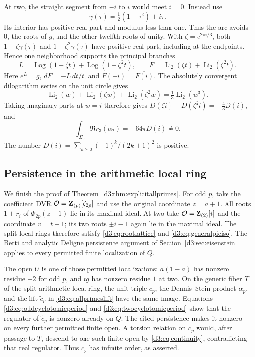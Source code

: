 At two, the straight segment from $-i$ to $i$ would meet $t=0$.
Instead use
\[
 \gamma(\tau)=\tfrac12(1-\tau^2)+i\tau .
\]
Its interior has positive real part and modulus less than one.
Thus the arc avoids $0$, the roots of $g$, and the other twelfth
roots of unity. With $\zeta=e^{2\pi i/3}$, both
$1-\zeta\gamma(\tau)$ and $1-\zeta^2\gamma(\tau)$ have positive
real part, including at the endpoints. Hence one neighborhood
supports the principal branches
\[
 L=\operatorname{Log}(1-\zeta t)+\operatorname{Log}(1-\zeta^2t),
 \qquad
 F=\operatorname{Li}_2(\zeta t)+\operatorname{Li}_2(\zeta^2t).
\]
Here $e^L=g$, $dF=-L\,dt/t$, and
$F(-i)=\overline{F(i)}$.
The absolutely convergent dilogarithm series on the unit circle gives
\[
 \operatorname{Li}_2(w)+\operatorname{Li}_2(\zeta w)
 +\operatorname{Li}_2(\zeta^2w)=\tfrac13\operatorname{Li}_2(w^3).
\]
Taking imaginary parts at $w=i$ therefore gives
$D(\zeta i)+D(\zeta^2i)=-\tfrac43D(i)$, and
\begin{equation}\label{d3:eq:twocyclotomicperiod}
 \int_{\Sigma_\gamma}\Re r_3(\alpha_2)
 =-64\pi D(i)\ne0.
\end{equation}
The number $D(i)=\sum_{k\geq0}(-1)^k/(2k+1)^2$ is positive.

\subsection{Persistence in the arithmetic local ring}

We finish the proof of Theorem~\ref{d3:thm:explicitallprimes}.
For odd $p$, take the coefficient DVR
$\mathcal O=\mathbf Z_{(p)}[\zeta_{2p}]$ and use the original coordinate $z=a+1$.
All roots $1+r_i$ of $\Phi_{2p}(z-1)$ lie in its maximal ideal.
At two take $\mathcal O=\mathbf Z_{(2)}[i]$ and the coordinate $v=t-1$; its
two roots $\pm i-1$ again lie in the maximal ideal.
The split local rings therefore satisfy \eqref{d3:eq:rootlattice}
and \eqref{d3:eq:generalpiciso}. The Betti and analytic Deligne
persistence argument of Section~\ref{d3:sec:eisenstein} applies to
every permitted finite localization of $Q$.

The open $U$ is one of those permitted localizations:
$a(1-a)$ has nonzero residue $-2$ for odd $p$, and $tg$ has
nonzero residue $1$ at two. On the generic fiber $T$ of the split
arithmetic local ring, the unit triple $c_p$, the Dennis--Stein
product $\alpha_p$, and the lift $\widetilde c_p$ in
\eqref{d3:eq:allprimeslift} have the same image.
Equations \eqref{d3:eq:oddcyclotomicperiod} and
\eqref{d3:eq:twocyclotomicperiod} show that the regulator of
$\widetilde c_p$ is nonzero already on $Q$.
The cited persistence makes it nonzero on every further permitted
finite open. A torsion relation on $c_p$ would, after passage to
$T$, descend to one such finite open by \eqref{d3:eq:continuity},
contradicting that real regulator.
Thus $c_p$ has infinite order, as asserted.


